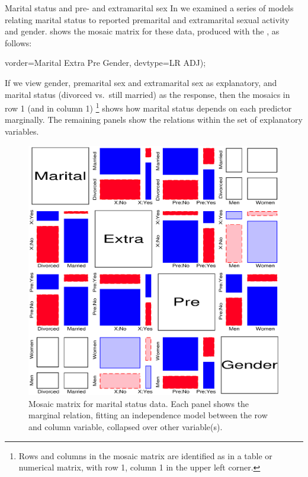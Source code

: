 \begin{Example}[marital2]{Marital status and pre- and extramarital sex}
In  we examined a series of models relating marital
status to reported premarital and extramarital sexual activity and gender.
 shows the mosaic matrix for these data,
produced with the , as follows:
\begin{listing}
   vorder=Marital Extra Pre Gender, devtype=LR ADJ);
\end{listing}

If we view gender, premarital sex and extramarital sex as explanatory,
and marital status (divorced vs.\  still married) as the response,
then the mosaics in row 1 (and in column 1)%
%
\footnote{Rows and columns in the mosaic matrix are identified
as in a table or numerical matrix, with row 1, column 1 in the upper left corner.}
%
shows how marital status
depends on each predictor marginally.
The remaining panels show the relations within the set of explanatory
variables.

\begin{figure}[htb]
  \centering
  \includegraphics[scale=.8]{ch4/fig/mosmat5m}
  \caption[Mosaic matrix for marital status data]{Mosaic matrix for marital status data.
  Each panel shows the marginal relation,
fitting an independence model between the row and column variable, collapsed over other variable(s).}%
  \label{fig:mosmat5}
\end{figure}


\end{Example}
